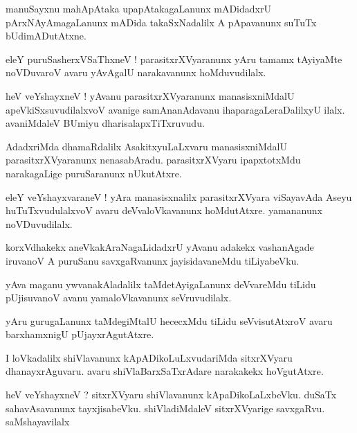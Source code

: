 \documentclass{article}
\begin{document}
\begin{mn}
manuSayxnu mahApAtaka upapAtakagaLanunx mADidadxrU pArxNAyAmagaLanunx mADida takaSxNadalilx A 
pApavanunx suTuTx bUdimADutAtxne.
\end{mn}

\begin{mn}
eleY puruSasherxVSaThxneV ! parasitxrXVyaranunx yAru tamamx  tAyiyaMte noVDuvaroV avaru yAvAgalU 
narakavanunx  hoMduvudilalx.
\end{mn}

\begin{mn}
heV veYshayxneV ! yAvanu parasitxrXVyaranunx manasisxniMdalU apeVkiSxsuvudilalxvoV avanige 
samAnanAdavanu ihaparagaLeraDalilxyU ilalx. avaniMdaleV BUmiyu dharisalapxTiTxruvudu.
\end{mn}

\begin{mn}
AdadxriMda dhamaRdalilx AsakitxyuLaLxvaru manasisxniMdalU parasitxrXVyaranunx nenasabAradu. 
parasitxrXVyaru ipapxtotxMdu narakagaLige puruSaranunx nUkutAtxre.
\end{mn}

\begin{mn}
eleY veYshayxvaraneV ! yAra manasisxnalilx parasitxrXVyara viSayavAda Aseyu huTuTxvudulalxvoV 
avaru deVvaloVkavanunx hoMdutAtxre. yamananunx noVDuvudilalx.
\end{mn}


\begin{mn}
korxVdhakekx aneVkakAraNagaLidadxrU yAvanu adakekx vashanAgade iruvanoV A puruSanu savxgaRvanunx 
jayisidavaneMdu tiLiyabeVku.
\end{mn}

\begin{mn}
yAva maganu ywvanakAladalilx taMdetAyigaLanunx deVvareMdu tiLidu pUjisuvanoV avanu yamaloVkavanunx 
seVruvudilalx.
\end{mn}

\begin{mn}
yAru gurugaLanunx taMdegiMtalU hececxMdu tiLidu seVvisutAtxroV avaru barxhamxnigU pUjayxrAgutAtxre.
\end{mn}

\begin{mn}
I loVkadalilx shiVlavanunx kApADikoLuLxvudariMda sitxrXVyaru dhanayxrAguvaru. avaru 
shiVlaBarxSaTxrAdare narakakekx hoVgutAtxre.
\end{mn}

\begin{mn}
heV veYshayxneV ? sitxrXVyaru shiVlavanunx kApaDikoLaLxbeVku. duSaTx sahavAsavanunx tayxjisabeVku.
shiVladiMdaleV sitxrXVyarige savxgaRvu. saMshayavilalx
\end{mn}
\end{document}
